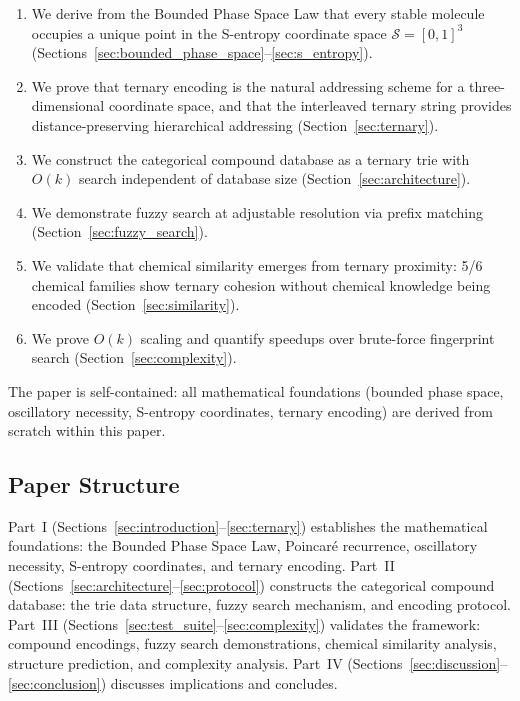 \documentclass[11pt,a4paper]{article}
\theoremstyle{definition}
\theoremstyle{remark}
\newcommand{\Sspace}{\mathcal{S}}
\begin{document}
\begin{enumerate}[nosep]
\item We derive from the Bounded Phase Space Law that every stable molecule occupies a unique point in the S-entropy coordinate space $\Sspace = [0,1]^3$ (Sections~\ref{sec:bounded_phase_space}--\ref{sec:s_entropy}).
\item We prove that ternary encoding is the natural addressing scheme for a three-dimensional coordinate space, and that the interleaved ternary string provides distance-preserving hierarchical addressing (Section~\ref{sec:ternary}).
\item We construct the categorical compound database as a ternary trie with $O(k)$ search independent of database size (Section~\ref{sec:architecture}).
\item We demonstrate fuzzy search at adjustable resolution via prefix matching (Section~\ref{sec:fuzzy_search}).
\item We validate that chemical similarity emerges from ternary proximity: 5/6 chemical families show ternary cohesion without chemical knowledge being encoded (Section~\ref{sec:similarity}).
\item We prove $O(k)$ scaling and quantify speedups over brute-force fingerprint search (Section~\ref{sec:complexity}).
\end{enumerate}

The paper is self-contained: all mathematical foundations (bounded phase space, oscillatory necessity, S-entropy coordinates, ternary encoding) are derived from scratch within this paper.

\subsection{Paper Structure}

Part~I (Sections~\ref{sec:introduction}--\ref{sec:ternary}) establishes the mathematical foundations: the Bounded Phase Space Law, Poincar\'e recurrence, oscillatory necessity, S-entropy coordinates, and ternary encoding. Part~II (Sections~\ref{sec:architecture}--\ref{sec:protocol}) constructs the categorical compound database: the trie data structure, fuzzy search mechanism, and encoding protocol. Part~III (Sections~\ref{sec:test_suite}--\ref{sec:complexity}) validates the framework: compound encodings, fuzzy search demonstrations, chemical similarity analysis, structure prediction, and complexity analysis. Part~IV (Sections~\ref{sec:discussion}--\ref{sec:conclusion}) discusses implications and concludes.
\end{document}
